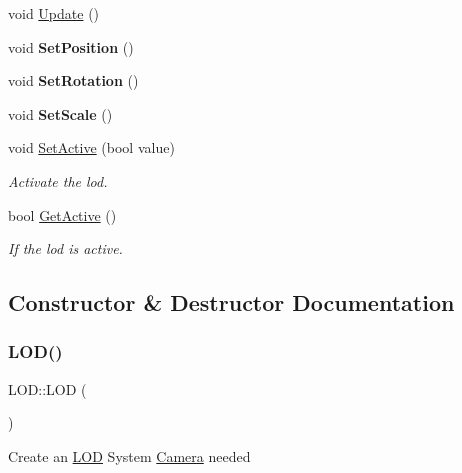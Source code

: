 \begin{DoxyCompactItemize}
void \mbox{\hyperlink{class_l_o_d_a624f5f007658c5a1a65dace8e40ab6ab}{Update}} ()
\item 
\mbox{\label{class_l_o_d_a8980cd062cb9045793736dfc2a8ded32}} 
void {\bfseries Set\+Position} ()
\item 
\mbox{\label{class_l_o_d_a90c3e508dfce950bd3aa026a7c79f4fd}} 
void {\bfseries Set\+Rotation} ()
\item 
\mbox{\label{class_l_o_d_a3d2f4a5cba2ee9c1e7cc7abdafa3add1}} 
void {\bfseries Set\+Scale} ()
\item 
\mbox{\label{class_l_o_d_a7f2841db780fbab708103c883ce775f9}} 
void \mbox{\hyperlink{class_l_o_d_a7f2841db780fbab708103c883ce775f9}{Set\+Active}} (bool value)
\begin{DoxyCompactList}\small\item\em Activate the lod. \end{DoxyCompactList}\item 
\mbox{\label{class_l_o_d_a69eabc87eeba31c99fde0aec57d2881a}} 
bool \mbox{\hyperlink{class_l_o_d_a69eabc87eeba31c99fde0aec57d2881a}{Get\+Active}} ()
\begin{DoxyCompactList}\small\item\em If the lod is active. \end{DoxyCompactList}\end{DoxyCompactItemize}


\subsection{Constructor \& Destructor Documentation}
\mbox{\label{class_l_o_d_abc34970b0abc2735ffed661eded0717f}} 
\subsubsection{\texorpdfstring{LOD()}{LOD()}}
{\footnotesize\ttfamily L\+O\+D\+::\+L\+OD (\begin{DoxyParamCaption}{ }\end{DoxyParamCaption})}

Create an \mbox{\hyperlink{class_l_o_d}{L\+OD}} System \mbox{\hyperlink{class_camera}{Camera}} needed 


